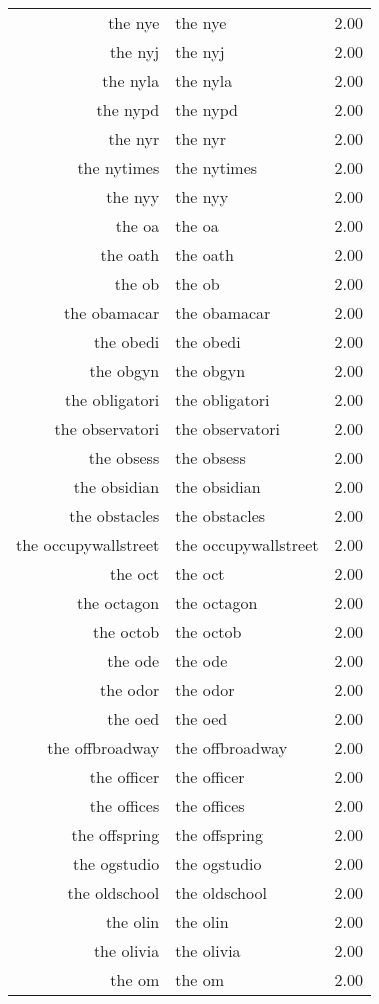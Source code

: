 \begin{table}[ht]
\begin{tabular}{rlr}
  the nye & the nye & 2.00 \\ 
  the nyj & the nyj & 2.00 \\ 
  the nyla & the nyla & 2.00 \\ 
  the nypd & the nypd & 2.00 \\ 
  the nyr & the nyr & 2.00 \\ 
  the nytimes & the nytimes & 2.00 \\ 
  the nyy & the nyy & 2.00 \\ 
  the oa & the oa & 2.00 \\ 
  the oath & the oath & 2.00 \\ 
  the ob & the ob & 2.00 \\ 
  the obamacar & the obamacar & 2.00 \\ 
  the obedi & the obedi & 2.00 \\ 
  the obgyn & the obgyn & 2.00 \\ 
  the obligatori & the obligatori & 2.00 \\ 
  the observatori & the observatori & 2.00 \\ 
  the obsess & the obsess & 2.00 \\ 
  the obsidian & the obsidian & 2.00 \\ 
  the obstacles & the obstacles & 2.00 \\ 
  the occupywallstreet & the occupywallstreet & 2.00 \\ 
  the oct & the oct & 2.00 \\ 
  the octagon & the octagon & 2.00 \\ 
  the octob & the octob & 2.00 \\ 
  the ode & the ode & 2.00 \\ 
  the odor & the odor & 2.00 \\ 
  the oed & the oed & 2.00 \\ 
  the offbroadway & the offbroadway & 2.00 \\ 
  the officer & the officer & 2.00 \\ 
  the offices & the offices & 2.00 \\ 
  the offspring & the offspring & 2.00 \\ 
  the ogstudio & the ogstudio & 2.00 \\ 
  the oldschool & the oldschool & 2.00 \\ 
  the olin & the olin & 2.00 \\ 
  the olivia & the olivia & 2.00 \\ 
  the om & the om & 2.00 \\ 

\end{tabular}
\end{table}
